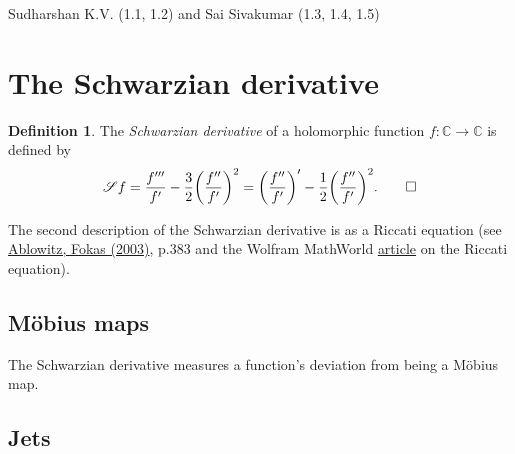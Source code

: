 \documentclass[11pt,leqno]{article}
\theoremstyle{plain}
\theoremstyle{definition}
\newtheorem{definition/}[lem]{Definition}
\newenvironment{definition}
  {\renewcommand{\qedsymbol}{\textdagger}%
   \pushQED{\qed}\begin{definition/}}
  {\popQED\end{definition/}}
\numberwithin{equation}{section}
\numberwithin{lem}{section}
\begin{document}
Sudharshan K.V. (1.1, 1.2) and Sai Sivakumar (1.3, 1.4, 1.5)

\section{The Schwarzian derivative}
\begin{definition}
    The \textit{Schwarzian derivative} of a holomorphic function $f\colon \mathbb C\to \mathbb C$ is defined by
    \[\mathscr Sf = \frac{f^{\prime\prime\prime}}{f^\prime}-\frac{3}{2}\biggl(\frac{f^{\prime\prime}}{f^\prime}\biggr)^2 = \biggl(\frac{f^{\prime\prime}}{f^\prime}\biggr)^\prime - \frac{1}{2}\biggl(\frac{f^{\prime\prime}}{f^\prime}\biggr)^2.\qedhere\]
\end{definition}
The second description of the Schwarzian derivative is as a Riccati equation (see \href{https://ftfsite.ru/wp-content/files/tfkp_endlish_2.2.pdf}{Ablowitz, Fokas (2003)}, p.383 and the Wolfram MathWorld \href{https://mathworld.wolfram.com/RiccatiDifferentialEquation.html}{article} on the Riccati equation).
\subsection{M\"obius maps}
The Schwarzian derivative measures a function's deviation from being a M\"obius map.
\subsection{Jets}
\end{document}
